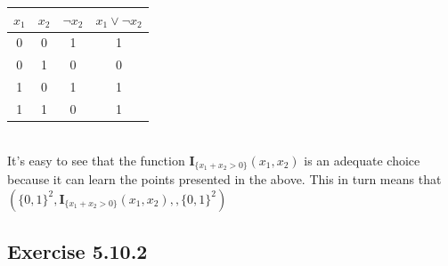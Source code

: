 \documentclass{exam}
\begin{document}
\begin{tabular}{|c c c c|}                                           
    \hline                                                           
    $x_1$ & $x_2$ & $\neg x_2$ & $x_{1}\lor \neg x_{2}$ \\ [0.5ex]   
    \hline                                                           
    0     & 0     & 1      & 1 \\                                    
    \hline                                                           
    0     & 1     & 0      & 0 \\                                    
    \hline                                                           
    1     & 0     & 1      & 1 \\                                    
    \hline                                                           
    1     & 1     & 0      & 1 \\                                    
    \hline                                                           
\end{tabular}\\                                                      

It's easy to see that the function $\mathbf{I}_{\{x_1 + x_2 > 0\}}(x_1, x_2)$ is an adequate choice because it can learn the  
points presented in the above. This in turn means that $(\{0,1\}^{2},\mathbf{I}_{\{x_1 + x_2 > 0\}}(x_1, x_2), ,\{0,1\}^{2})$

\subsection*{Exercise 5.10.2}
\end{document}
